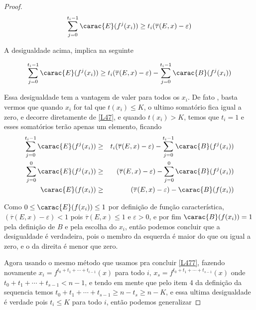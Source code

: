 \begin{proof}
\begin{equation}\label{L47}
\sum_{j=0}^{t_i-1}\carac{E}(f^j(x_i))\geq t_i(\overline{\tau}(E,x)-\varepsilon)
\end{equation}\vspace{0.1cm}

A desigualdade acima, implica na seguinte

\begin{equation}\label{L48}
\sum_{j=0}^{t_i-1}\carac{E}(f^j(x_i))\geq t_i(\overline{\tau}(E,x)-\varepsilon)-\sum_{j=0}^{t_i-1}\carac{B}(f^j(x_i))
\end{equation}\vspace{0.1cm}

Essa desigualdade tem a vantagem de valer para todos os $x_i$. De fato , basta vermos que quando $x_i$ for tal que $t(x_i)\leq K$, o ultimo somatório fica igual a zero, e decorre diretamente de \eqref{L47}, e quando $t(x_i)> K$, temos que $t_{i}=1$ e esses somatórios terão apenas um elemento, ficando
\begin{eqnarray*}
\sum_{j=0}^{t_i-1}\carac{E}(f^j(x_i)) & \geq & t_i(\overline{\tau}(E,x)-\varepsilon)-\sum_{j=0}^{t_i-1}\carac{B}(f^j(x_i))\\
\sum_{j=0}^{0}\carac{E}(f^j(x_i)) & \geq & (\overline{\tau}(E,x)-\varepsilon)-\sum_{j=0}^{0}\carac{B}(f^j(x_i))\\\carac{E}(f(x_i)) & \geq & (\overline{\tau}(E,x)-\varepsilon)-\carac{B}(f(x_i))
\end{eqnarray*}\vspace{0.1cm}

Como $0\leq\carac{E}(f(x_i))\leq1$ por definição de função característica, $(\overline{\tau}(E,x)-\varepsilon)<1$ pois 
$\overline{\tau}(E,x)\leq1$ e $\varepsilon>0$, e por fim $\carac{B}(f(x_i))=1$ pela definição de $B$ e pela escolha do $x_i$, então podemos concluir que a desigualdade é verdadeira, pois o membro da esquerda é maior do que ou igual a zero, e o da direita é menor que zero.

Agora usando o mesmo método que usamos pra concluir \eqref{L477}, fazendo novamente $x_i = f^{t_0+t_1+\cdots+t_{i-1}}(x)$ para todo $i$, $x_s = f^{t_0+t_1+\cdots+t_{s-1}}(x)$ onde $t_0+t_1+\cdots+t_{s-1}<n-1$, e tendo em mente que pelo item 4 da definição da sequencia temos $t_0+t_1+\cdots+t_{s-1}\geq n-t_s \geq n-K$, e essa ultima desigualdade é verdade pois $t_i\leq K$ para todo $i$, então podemos generalizar


\end{proof}

